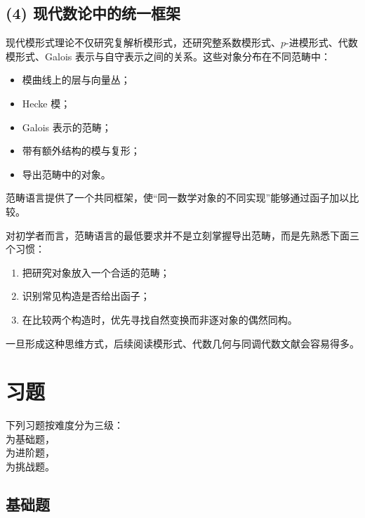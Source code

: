 \subsection*{(4) 现代数论中的统一框架}

现代模形式理论不仅研究复解析模形式，还研究整系数模形式、$p$-进模形式、代数模形式、Galois 表示与自守表示之间的关系。这些对象分布在不同范畴中：
\begin{itemize}[leftmargin=2em]
  \item 模曲线上的层与向量丛；
  \item Hecke 模；
  \item Galois 表示的范畴；
  \item 带有额外结构的模与复形；
  \item 导出范畴中的对象。
\end{itemize}
范畴语言提供了一个共同框架，使“同一数学对象的不同实现”能够通过函子加以比较。

\begin{remark}
对初学者而言，范畴语言的最低要求并不是立刻掌握导出范畴，而是先熟悉下面三个习惯：
\begin{enumerate}[label=(\arabic*), leftmargin=2.5em]
  \item 把研究对象放入一个合适的范畴；
  \item 识别常见构造是否给出函子；
  \item 在比较两个构造时，优先寻找自然变换而非逐对象的偶然同构。
\end{enumerate}
一旦形成这种思维方式，后续阅读模形式、代数几何与同调代数文献会容易得多。
\end{remark}

\section*{习题}

下列习题按难度分为三级：\basic\\ 为基础题，\medium\\ 为进阶题，\hard\\ 为挑战题。

\subsection*{基础题}

